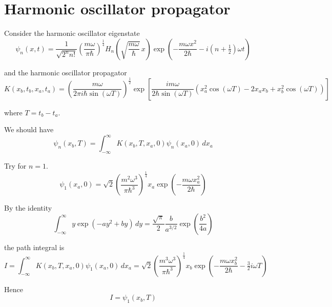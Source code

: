 

\section*{Harmonic oscillator propagator}

Consider the harmonic oscillator eigenstate
\begin{equation*}
\psi_n(x,t)=\frac{1}{\sqrt{2^nn!}}\left(\frac{m\omega}{\pi\hbar}\right)^\frac{1}{4}
H_n\left(\sqrt{\frac{m\omega}{\hbar}}\,x\right)
\exp\left(-\frac{m\omega x^2}{2\hbar}-i\left(n+\tfrac{1}{2}\right)\omega t\right)
\end{equation*}

and the harmonic oscillator propagator
\begin{equation*}
K(x_b,t_b,x_a,t_a)
=\left(\frac{m\omega}{2\pi i\hbar\sin(\omega T)}\right)^\frac{1}{2}
\exp\left[
\frac{im\omega}{2\hbar\sin(\omega T)}
\left(x_a^2\cos(\omega T)-2x_ax_b+x_b^2\cos(\omega T)\right)
\right]
\end{equation*}

where $T=t_b-t_a$.

\bigskip
We should have
\begin{equation*}
\psi_n(x_b,T)=\int_{-\infty}^\infty K(x_b,T,x_a,0)\psi_n(x_a,0)\,dx_a
\end{equation*}

Try for $n=1$.
\begin{equation*}
\psi_1(x_a,0)=\sqrt2\left(\frac{m^2\omega^3}{\pi\hbar^3}\right)^\frac{1}{4}
x_a\exp\left(-\frac{m\omega x_a^2}{2\hbar}\right)
\end{equation*}

By the identity
\begin{equation*}
\int_{-\infty}^\infty y\exp\left(-ay^2+by\right)\,dy
=\frac{\sqrt\pi}{2}\frac{b}{a^{3/2}}\exp\left(\frac{b^2}{4a}\right)
\end{equation*}

the path integral is
\begin{equation*}
I=\int_{-\infty}^\infty K(x_b,T,x_a,0)\psi_1(x_a,0)\,dx_a
=\sqrt2\left(\frac{m^3\omega^3}{\pi\hbar^3}\right)^\frac{1}{4}
x_b\exp\left(-\frac{m\omega x_b^2}{2\hbar}-\tfrac{3}{2}i\omega T\right)
\end{equation*}

Hence
\begin{equation*}
I=\psi_1(x_b,T)
\end{equation*}




